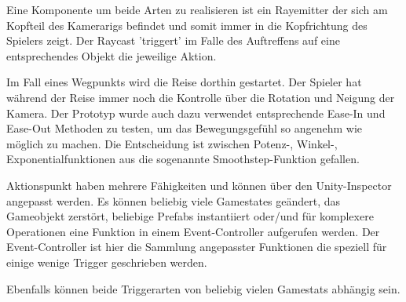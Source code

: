 Eine Komponente um beide Arten zu realisieren ist ein Rayemitter der sich am Kopfteil des Kamerarigs befindet und somit immer in die Kopfrichtung des Spielers zeigt. Der Raycast 'triggert' im Falle des Auftreffens auf eine entsprechendes Objekt die jeweilige Aktion.

Im Fall eines Wegpunkts wird die Reise dorthin gestartet. Der Spieler hat während der Reise immer noch die Kontrolle über die Rotation und Neigung der Kamera. Der Prototyp wurde auch dazu verwendet entsprechende Ease-In und Ease-Out Methoden zu testen, um das Bewegungsgefühl so angenehm wie möglich zu machen.
Die Entscheidung ist zwischen Potenz-, Winkel-, Exponentialfunktionen aus die sogenannte Smoothstep-Funktion gefallen.

Aktionspunkt haben mehrere Fähigkeiten und können über den Unity-Inspector angepasst werden. Es können beliebig viele Gamestates geändert, das Gameobjekt zerstört, beliebige Prefabs instantiiert oder/und für komplexere Operationen eine Funktion in einem Event-Controller aufgerufen werden. Der Event-Controller ist hier die Sammlung angepasster Funktionen die speziell für einige wenige Trigger geschrieben werden.

Ebenfalls können beide Triggerarten von beliebig vielen Gamestats abhängig sein.
